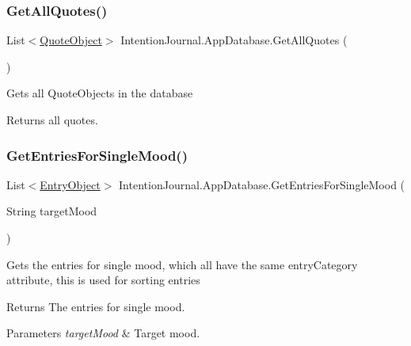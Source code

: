 \subsubsection{\texorpdfstring{Get\+All\+Quotes()}{GetAllQuotes()}}
{\footnotesize\ttfamily List$<$\hyperlink{class_intention_journal_1_1_quote_object}{Quote\+Object}$>$ Intention\+Journal.\+App\+Database.\+Get\+All\+Quotes (\begin{DoxyParamCaption}{ }\end{DoxyParamCaption})\hspace{0.3cm}{\ttfamily [inline]}}



Gets all Quote\+Objects in the database 

\begin{DoxyReturn}{Returns}
all quotes.
\end{DoxyReturn}
\mbox{\label{class_intention_journal_1_1_app_database_a361d6772fd3a16d2bfca062d97a9ecde}} 
\subsubsection{\texorpdfstring{Get\+Entries\+For\+Single\+Mood()}{GetEntriesForSingleMood()}}
{\footnotesize\ttfamily List$<$\hyperlink{class_intention_journal_1_1_entry_object}{Entry\+Object}$>$ Intention\+Journal.\+App\+Database.\+Get\+Entries\+For\+Single\+Mood (\begin{DoxyParamCaption}\item[{String}]{target\+Mood }\end{DoxyParamCaption})\hspace{0.3cm}{\ttfamily [inline]}}



Gets the entries for single mood, which all have the same entry\+Category attribute, this is used for sorting entries 

\begin{DoxyReturn}{Returns}
The entries for single mood.
\end{DoxyReturn}

\begin{DoxyParams}{Parameters}
{\em target\+Mood} & Target mood.\\
\hline
\end{DoxyParams}
\mbox{\label{class_intention_journal_1_1_app_database_ac06d1fa6aeb5a2eb479b7d6c0f47cb94}} 
